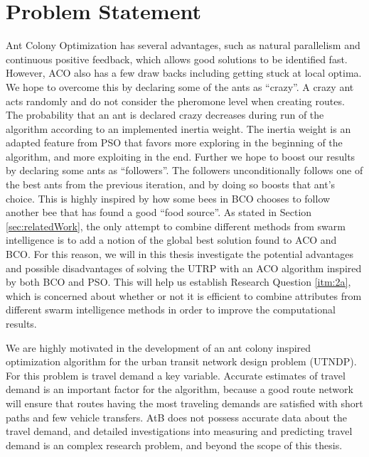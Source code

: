 \section{Problem Statement}

Ant Colony Optimization has several advantages, such as natural parallelism and continuous positive feedback, which allows good solutions to be identified fast. However, ACO also has a few draw backs including getting stuck at local optima. We hope to overcome this by declaring some of the ants as ``crazy''. A crazy ant acts randomly and do not consider the pheromone level when creating routes. The probability that an ant is declared crazy decreases during run of the algorithm according to an implemented inertia weight. The inertia weight is an adapted feature from PSO that favors more exploring in the beginning of the algorithm, and more exploiting in the end. Further we hope to boost our results by declaring some ants as ``followers''. The followers unconditionally follows one of the best ants from the previous iteration, and by doing so boosts that ant's choice. This is highly inspired by how some bees in BCO chooses to follow another bee that has found a good ``food source''. As stated in Section \vref{sec:relatedWork}, the only attempt to combine different methods from swarm intelligence is to add a notion of the global best solution found to ACO and BCO. For this reason, we will in this thesis investigate the potential advantages and possible disadvantages of solving the UTRP with an ACO algorithm inspired by both BCO and PSO. This will help us establish Research Question \vref{itm:2a}, which is concerned about whether or not it is efficient to combine attributes from different swarm intelligence methods in order to improve the computational results.

We are highly motivated in the development of an ant colony inspired optimization algorithm for the urban transit network design problem (UTNDP). For this problem is travel demand a key variable. Accurate estimates of travel demand is an important factor for the algorithm, because a good route network will ensure that routes having the most traveling demands are satisfied with short paths and few vehicle transfers. AtB does not possess accurate data about the travel demand, and detailed investigations into measuring and predicting travel demand is an complex research problem, and beyond the scope of this thesis. 

